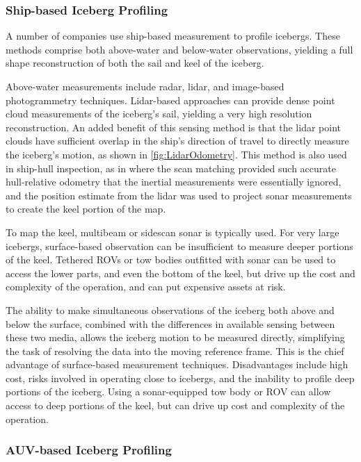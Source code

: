 \subsubsection{Ship-based Iceberg Profiling}

A number of companies use ship-based measurement to profile icebergs. These methods comprise both above-water and below-water observations, yielding a full shape reconstruction of both the sail and keel of the iceberg. 

Above-water measurements include radar, lidar, and image-based photogrammetry techniques. Lidar-based approaches can provide dense point cloud measurements of the iceberg's sail, yielding a very high resolution reconstruction. An added benefit of this sensing method is that the lidar point clouds have sufficient overlap in the ship's direction of travel to directly measure the iceberg's motion, as shown in \ref{fig:LidarOdometry}. This method is also used in ship-hull inspection, as in \cite{Papadopoulos2014} where the scan matching provided such accurate hull-relative odometry that the inertial measurements were essentially ignored, and the position estimate from the lidar was used to project sonar measurements to create the keel portion of the map.

To map the keel, multibeam or sidescan sonar is typically used. For very large icebergs, surface-based observation can be insufficient to measure deeper portions of the keel. Tethered ROVs or tow bodies outfitted with sonar can be used to access the lower parts, and even the bottom of the keel, but drive up the cost and complexity of the operation, and can put expensive assets at risk. 

The ability to make simultaneous observations of the iceberg both above and below the surface, combined with the differences in available sensing between these two media, allows the iceberg motion to be measured directly, simplifying the task of resolving the data into the moving reference frame. This is the chief advantage of surface-based measurement techniques. Disadvantages include high cost, risks involved in operating close to icebergs, and the inability to profile deep portions of the iceberg. Using a sonar-equipped tow body or ROV can allow access to deep portions of the keel, but can drive up cost and complexity of the operation. 


\subsubsection{AUV-based Iceberg Profiling}

